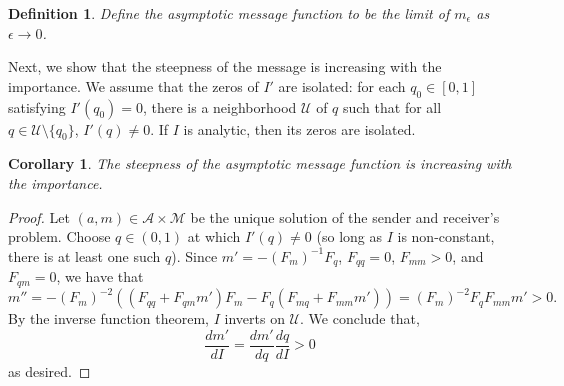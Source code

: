 \documentclass[12pt]{article}
\newtheorem{corollary}{Corollary}
\newtheorem{definition}{Definition}
\begin{document}
\begin{definition}
Define the asymptotic message function to be the limit of $m_{\epsilon}$ as $\epsilon\rightarrow0$. 
\end{definition}

Next, we show that the steepness of the message is increasing with the importance. We assume that the zeros of $I'$ are isolated: for each $q_{0}\in[0,1]$ satisfying $I'(q_{0})=0$, there is a neighborhood $\mathcal{U}$ of $q$ such that for all $q\in\mathcal{U}\setminus\{q_{0}\}$, $I'(q)\neq0$. If $I$ is analytic, then its zeros are isolated. 
\begin{corollary}
The steepness of the asymptotic message function is increasing with the importance.
\end{corollary}
\begin{proof}
Let $(a,m)\in\mathcal{A}\times\mathcal{M}$ be the unique solution of the sender and receiver's problem. Choose $q\in(0,1)$ at which $I'(q)\neq0$ (so long as $I$ is non-constant, there is at least one such $q$). Since $m'=-(F_{m})^{-1}F_{q}$, $F_{qq}=0$, $F_{mm}>0$, and $F_{qm}=0$, we have that
\begin{equation}
m''=-(F_{m})^{-2}((F_{qq}+F_{qm}m')F_{m}-F_{q}(F_{mq}+F_{mm}m'))=(F_{m})^{-2}F_{q}F_{mm}m'>0.
\end{equation}
By the inverse function theorem, $I$ inverts on $\mathcal{U}$. We conclude that, 
\begin{equation}
\frac{dm'}{dI}=\frac{dm'}{dq}\frac{dq}{dI}>0
\end{equation}
as desired.
\end{proof}
\end{document}

